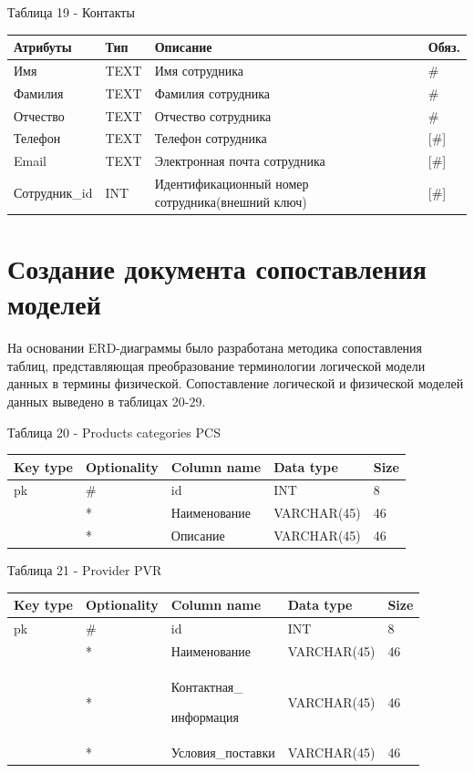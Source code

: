 \documentclass[14pt]{extreport}
\begin{document}
\noindent
Таблица 19 - Контакты
\begin{center}
\begin{longtable}{ |m{3.3cm}|m{3cm}|m{6cm}|m{1.8cm}| } 
 \hline
 Атрибуты & Тип & Описание & Обяз. \\ [0.5ex] 
 \hline\hline
 Имя & TEXT & Имя сотрудника & \# \\
 \hline
 Фамилия & TEXT & Фамилия сотрудника & \# \\
 \hline
 Отчество & TEXT & Отчество сотрудника & \# \\
 \hline
 Телефон & TEXT & Телефон сотрудника & [\#] \\
 \hline
 Email & TEXT & Электронная почта сотрудника & [\#] \\
 \hline
 Сотрудник\_id & INT & Идентификационный номер сотрудника(внешний ключ) & [\#] \\
 \hline
\end{longtable}
\end{center}


\newpage

\section{Создание документа сопоставления моделей}
На основании ERD-диаграммы было разработана методика сопоставления таблиц, представляющая преобразование терминологии логической модели данных в термины физической. Сопоставление логической и физической моделей данных выведено в таблицах 20-29.


\noindent
Таблица 20 - Products categories PCS
\begin{center}
\begin{longtable}{ |m{1.3cm}|m{2.7cm}|m{4.5cm}|m{3.5cm}|m{1.8cm}| } 
 \hline
 Key type & Optionality & Column name & Data type & Size \\ [0.5ex] 
 \hline\hline
 pk & \# & id & INT & 8 \\
 \hline
  & * & Наименование & VARCHAR(45) & 46 \\
 \hline
  & * & Описание & VARCHAR(45) & 46 \\
 \hline
\end{longtable}
\end{center}


\noindent
Таблица 21 - Provider PVR
\begin{center}
\begin{longtable}{ |m{1.3cm}|m{2.7cm}|m{4.5cm}|m{3.5cm}|m{1.8cm}| } 
 \hline
 Key type & Optionality & Column name & Data type & Size \\ [0.5ex] 
 \hline\hline
 pk & \# & id & INT & 8 \\
 \hline
  & * & Наименование & VARCHAR(45) & 46 \\
 \hline
  & * & Контактная\_
  
  информация & VARCHAR(45) & 46 \\
  \hline
  & * & Условия\_поставки & VARCHAR(45) & 46 \\
 \hline
\end{longtable}
\end{center}
\end{document}

